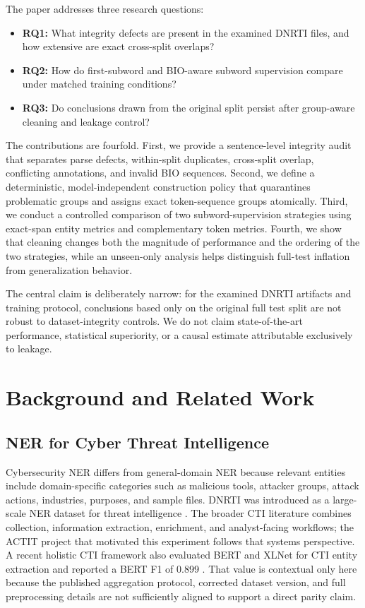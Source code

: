 \documentclass[conference]{IEEEtran}
\begin{document}
The paper addresses three research questions:

\begin{itemize}
    \item \textbf{RQ1:} What integrity defects are present in the examined DNRTI files, and how extensive are exact cross-split overlaps?
    \item \textbf{RQ2:} How do first-subword and BIO-aware subword supervision compare under matched training conditions?
    \item \textbf{RQ3:} Do conclusions drawn from the original split persist after group-aware cleaning and leakage control?
\end{itemize}

The contributions are fourfold. First, we provide a sentence-level integrity audit that separates parse defects, within-split duplicates, cross-split overlap, conflicting annotations, and invalid BIO sequences. Second, we define a deterministic, model-independent construction policy that quarantines problematic groups and assigns exact token-sequence groups atomically. Third, we conduct a controlled comparison of two subword-supervision strategies using exact-span entity metrics and complementary token metrics. Fourth, we show that cleaning changes both the magnitude of performance and the ordering of the two strategies, while an unseen-only analysis helps distinguish full-test inflation from generalization behavior.

The central claim is deliberately narrow: for the examined DNRTI artifacts and training protocol, conclusions based only on the original full test split are not robust to dataset-integrity controls. We do not claim state-of-the-art performance, statistical superiority, or a causal estimate attributable exclusively to leakage.

\section{Background and Related Work}
\subsection{NER for Cyber Threat Intelligence}
Cybersecurity NER differs from general-domain NER because relevant entities include domain-specific categories such as malicious tools, attacker groups, attack actions, industries, purposes, and sample files. DNRTI was introduced as a large-scale NER dataset for threat intelligence \cite{dnrti2020}. The broader CTI literature combines collection, information extraction, enrichment, and analyst-facing workflows; the ACTIT project that motivated this experiment follows that systems perspective. A recent holistic CTI framework also evaluated BERT and XLNet for CTI entity extraction and reported a BERT F1 of 0.899 \cite{alazab2025holistic}. That value is contextual only here because the published aggregation protocol, corrected dataset version, and full preprocessing details are not sufficiently aligned to support a direct parity claim.
\end{document}
